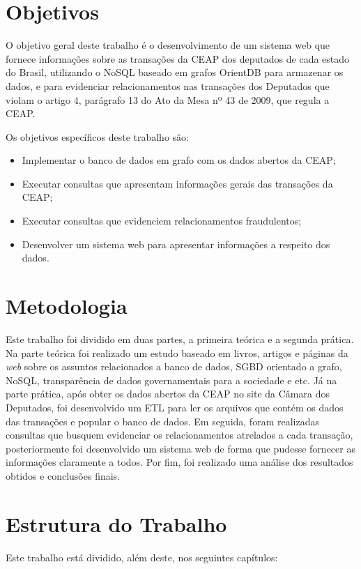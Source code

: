 \section{Objetivos}
	O objetivo geral deste trabalho é o desenvolvimento de um sistema web que fornece informações sobre as transações da CEAP dos deputados de cada estado do Brasil, utilizando o NoSQL baseado em grafos OrientDB para armazenar os dados, e para evidenciar relacionamentos nas transações dos Deputados que violam o artigo 4, parágrafo 13 do Ato da Mesa nº 43 de 2009, que regula a CEAP. 
	
	Os objetivos específicos deste trabalho são:
	\begin{itemize}
		\item Implementar o banco de dados em grafo com os dados abertos da CEAP;
		\item Executar consultas que apresentam informações gerais das transações da CEAP;
		\item Executar consultas que evidenciem relacionamentos fraudulentos;
		\item Desenvolver um sistema web para apresentar informações a respeito dos dados.
	\end{itemize}

\section{Metodologia}

	Este trabalho foi dividido em duas partes, a primeira teórica e a segunda prática. Na parte teórica foi realizado um estudo baseado em livros, artigos e páginas da \textit{web} sobre os assuntos relacionados a banco de dados, SGBD orientado a grafo, NoSQL, transparência de dados governamentais para a sociedade e etc. Já na parte prática, após obter os dados abertos da CEAP no site da Câmara dos Deputados, foi desenvolvido um ETL para ler os arquivos que contém os dados das transações e popular o banco de dados. Em seguida, foram realizadas consultas que busquem evidenciar os relacionamentos atrelados a cada transação, posteriormente foi desenvolvido um sistema web de forma que pudesse fornecer as informações claramente a todos. Por fim, foi realizado uma análise dos resultados obtidos e conclusões finais.

\section{Estrutura do Trabalho}
	Este trabalho está dividido, além deste, nos seguintes capítulos:
	
